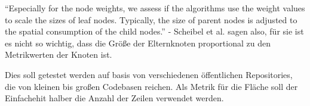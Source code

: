 \enquote{Especially for the node weights, we assess if the algorithms use the weight values to scale the sizes of leaf nodes. Typically, the size of parent nodes is adjusted to the spatial consumption of the child nodes.}\cite[3]{scheibel2020survey} - Scheibel et al. sagen also, für sie ist es nicht so wichtig, dass die Größe der Elternknoten proportional zu den Metrikwerten der Knoten ist.

Dies soll getestet werden auf basis von verschiedenen öffentlichen Repositories, die von kleinen bis großen Codebasen reichen. Als Metrik für die Fläche soll der Einfachehit halber die Anzahl der Zeilen verwendet werden.
